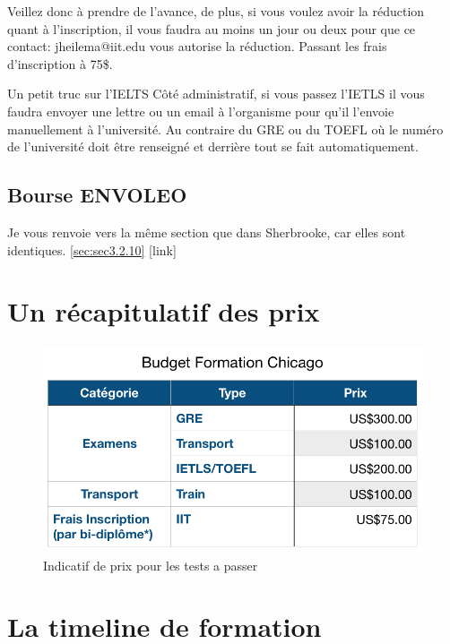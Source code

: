 Veillez donc à prendre de l’avance, de plus, si vous voulez avoir la réduction quant à l’inscription, il vous faudra au moins un jour ou deux pour que ce contact: jheilema@iit.edu vous autorise la réduction. Passant les frais d’inscription à 75\$.

\begin{example}{Un petit truc sur l’IELTS}
  Côté administratif, si vous passez l’IETLS il vous faudra envoyer une lettre ou un email à l’organisme pour qu’il l’envoie manuellement à l’université. Au contraire du GRE ou du TOEFL où le numéro de l’université doit être renseigné et derrière tout se fait automatiquement.
\end{example}


\subsection{Bourse ENVOLEO}\label{sec:sec2.3.2}
Je vous renvoie vers la même section que dans Sherbrooke, car elles sont identiques. \ref{sec:sec3.2.10} [link]


\section{Un récapitulatif des prix}\label{sec:sec2.4}

\begin{figure}[h!]
\centering
\includegraphics[width = 120mm]{figures/Budget_Chicago}
\caption{Indicatif de prix pour les tests a passer}
\end{figure}


\section{La timeline de formation}\label{sec:sec2.5}

